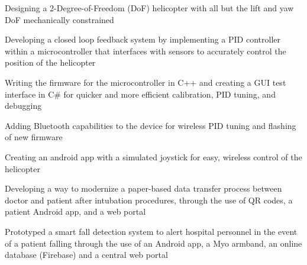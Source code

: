 \documentclass[]{aftab-resume}
\begin{document}
\begin{minipage}[t]{0.66\textwidth}
\begin{tightemize}
\item Designing a 2-Degree-of-Freedom (DoF) helicopter with all but the lift and yaw DoF mechanically constrained
\item Developing a closed loop feedback system by implementing a PID controller within a microcontroller that interfaces with sensors to accurately control the position of the helicopter
\item Writing the firmware for the microcontroller in C++ and creating a GUI test interface in C\# for quicker and more efficient calibration, PID tuning, and debugging
\item Adding Bluetooth capabilities to the device for wireless PID tuning and flashing of new firmware
\item Creating an android app with a simulated joystick for easy, wireless control of the helicopter 
\end{tightemize}

\sectionsep



\begin{tightemize}
\item Developing a way to modernize a paper-based data transfer process between doctor and patient after intubation
procedures, through the use of QR codes, a patient Android app, and a web portal
\end{tightemize}

\sectionsep



\begin{tightemize}
\item Prototyped a smart fall detection system to alert hospital personnel in the event of a patient falling through the use of an Android app, a Myo armband, an online database (Firebase) and a central web portal
\end{tightemize}

\sectionsep

\end{minipage} %
\end{document}
